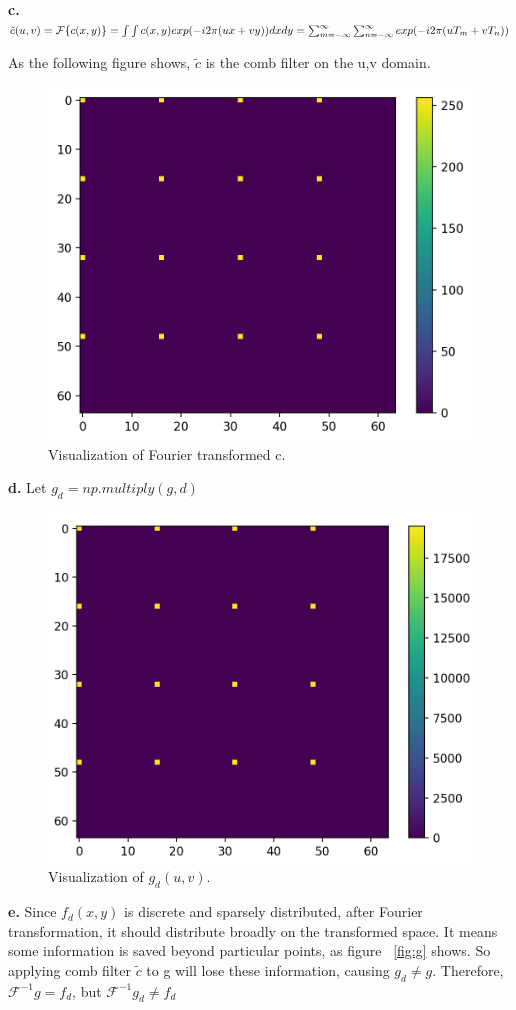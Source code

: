 \documentclass[11pt,a4paper]{article}
\begin{document}
\textbf{c.}
$\tilde{c}(u,v)=\mathcal{F}\{c(x,y)\}=\int\int c(x,y)exp(-i2\pi(ux+vy))dxdy\\
=\sum_{m=-\infty}^{\infty}\sum_{n=-\infty}^{\infty}exp(-i2\pi(uT_m+vT_n))$

As the following figure shows, $\tilde{c}$ is the comb filter on the u,v domain.

\begin{figure}[!htp]
    \centering
    \includegraphics[width=0.6\linewidth]{HW2_Q5_3.png}
    \caption{Visualization of Fourier transformed c.}
    \label{fig:fc}
\end{figure}

\textbf{d.}
Let $g_d=np.multiply(g, d)$
\begin{figure}[!htp]
    \centering
    \includegraphics[width=0.6\linewidth]{HW2_Q5_4.2.png}
    \caption{Visualization of $g_d(u, v)$.}
    \label{fig:gd}
\end{figure}

\textbf{e.}
Since $f_d(x,y)$ is discrete and sparsely distributed, after Fourier transformation, it should distribute broadly on the transformed space. It means some information is saved beyond particular points, as figure ~\ref{fig:g} shows. So applying comb filter $\tilde{c}$ to g will lose these information, causing $g_d\ne g$. Therefore, $\mathcal{F}^{-1}g=f_d$, but $\mathcal{F}^{-1}g_d\ne f_d$ 
\end{document}
